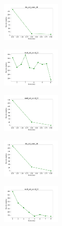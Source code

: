 \newpage

\begin{figure}[H]
    \centering
    \begin{subfigure}
        \centering
        \includegraphics[width=0.32\textwidth]{img/copkm/iris_set_const_10_949004259_cost.png}
    \end{subfigure}
    \hfill
    \begin{subfigure}
        \centering
        \includegraphics[width=0.32\textwidth]{img/copkm/ecoli_set_const_10_949004259_cost.png}
    \end{subfigure}
    \hfill
    \begin{subfigure}
        \centering
        \includegraphics[width=0.32\textwidth]{img/copkm/rand_set_const_10_949004259_cost.png}
    \end{subfigure}
    \hfill
    \begin{subfigure}
        \centering
        \includegraphics[width=0.32\textwidth]{img/copkm/iris_set_const_10_589741062_cost.png}
    \end{subfigure}
    \hfill
    \begin{subfigure}
        \centering
        \includegraphics[width=0.32\textwidth]{img/copkm/ecoli_set_const_10_589741062_cost.png}

\end{subfigure}
\end{figure}
